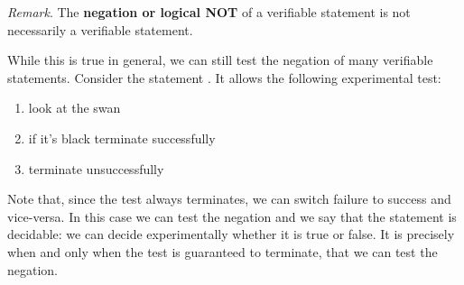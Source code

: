 \documentclass[11pt,letterpaper,fleqn]{memoir} %
\begin{document}
\begin{mathSection}
	\emph{Remark}. The \textbf{negation or logical NOT} of a verifiable statement is not necessarily a verifiable statement.
\end{mathSection}

While this is true in general, we can still test the negation of many verifiable statements. Consider the statement . It allows the following experimental test:
\begin{enumerate}
	\item look at the swan
	\item if it's black terminate successfully
	\item terminate unsuccessfully
\end{enumerate}
Note that, since the test always terminates, we can switch failure to success and vice-versa. In this case we can test the negation and we say that the statement is decidable: we can decide experimentally whether it is true or false. It is precisely when and only when the test is guaranteed to terminate, that we can test the negation.
\end{document}
